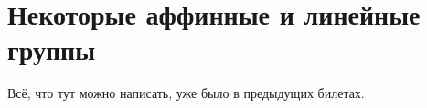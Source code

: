 \section{Некоторые аффинные и линейные группы}

Всё, что тут можно написать, уже было в предыдущих билетах.

